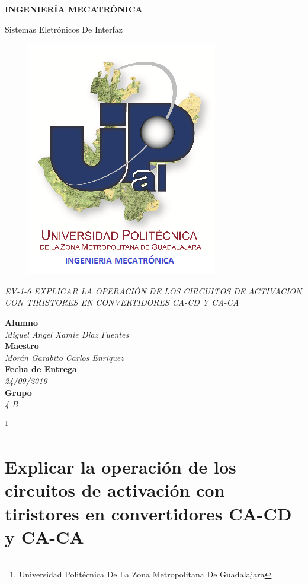 \documentclass[11pt,a4paper]{article}
\author{Miguel Angel Xamie Diaz Fuentes}
\begin{document}
\begin{center}
\begin{LARGE}
\textbf{INGENIERÍA MECATRÓNICA}\\
\end{LARGE}
Sistemas Eletrónicos De Interfaz\\
\begin{figure}[hbtp]
\centering
\includegraphics[scale=0.70]{UPZMG_Mecatr_nica.png}
\end{figure} 
\begin{center}
{\Large \emph{EV-1-6 EXPLICAR LA OPERACIÓN DE LOS CIRCUITOS DE ACTIVACION CON TIRISTORES EN CONVERTIDORES CA-CD Y CA-CA}}
\end{center}

\textbf{Alumno}
\\\textit{Miguel Angel Xamie Diaz Fuentes}
\textbf{\\Maestro}
\\\textit{Morán Garabito Carlos Enriquez}
\textbf{\\Fecha de Entrega}
\\\textit{24/09/2019}
\textbf{\\Grupo}
\\\textit{4-B}
\end{center}

\footnote{Universidad Politécnica De La Zona Metropolitana De Guadalajara} 

\pagebreak

\section{Explicar la operación de los circuitos de activación con tiristores en convertidores CA-CD y CA-CA}
\end{document}
